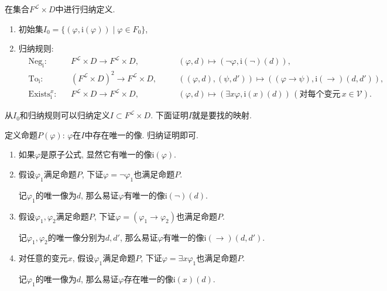 \documentclass[UTF8]{ctexart}
\begin{document}
在集合$F^{\mathcal{L}}\times D$中进行归纳定义.
\begin{enumerate}
    \item 初始集$I_0=\{(\varphi,\mathrm{i}(\varphi))\mid \varphi\in F_0\}$,
    \item 归纳规则:
    \[\begin{aligned}
        &\mathrm{Neg}_{\mathrm{i}}:&&
        F^{\mathcal{L}}\times D\to F^{\mathcal{L}}\times D,\quad&&
        (\varphi,d)\mapsto(\neg\varphi,\mathrm{i}(\neg)(d)),\\[-3pt]
        &\mathrm{To}_{\mathrm{i}}:&&
        (F^{\mathcal{L}}\times D)^2\to F^{\mathcal{L}}\times D,\quad&&
        ((\varphi,d),(\psi,d'))\mapsto((\varphi\to\psi),\mathrm{i}(\to)(d,d')),\\[-3pt]
        &\mathrm{Exists}_{\mathrm{i}}^x:&&
        F^{\mathcal{L}}\times D\to F^{\mathcal{L}}\times D,\quad&&
        (\varphi,d)\mapsto(\exists x\varphi,\mathrm{i}(x)(d))
        \,(\text{对每个变元}\,x\in\mathcal{V}).
    \end{aligned}\]
\end{enumerate}
从$I_0$和归纳规则可以归纳定义$I\subset F^{\mathcal{L}}\times D$.
下面证明$I$就是要找的映射.

定义命题$P(\varphi)$: $\varphi$在$I$中存在唯一的像. 归纳证明即可.

\begin{enumerate}
    \item 如果$\varphi$是原子公式, 显然它有唯一的像$\mathrm{i}(\varphi)$.
    
    \item 假设$\varphi_1$满足命题$P$, 下证$\varphi=\neg\varphi_1$也满足命题$P$.
    
    \hspace{2.17em}
    记$\varphi_1$的唯一像为$d$, 那么易证$\varphi$有唯一的像$\mathrm{i}(\neg)(d)$.

    \item 假设$\varphi_1,\varphi_2$满足命题$P$,
    下证$\varphi=(\varphi_1\to\varphi_2)$也满足命题$P$.

    \hspace{2.17em}
    记$\varphi_1,\varphi_2$的唯一像分别为$d,d'$,
    那么易证$\varphi$有唯一的像$\mathrm{i}(\to)(d,d')$.

    \item 对任意的变元$x$, 假设$\varphi_1$满足命题$P$,
    下证$\varphi=\exists x\varphi_1$也满足命题$P$.

    \hspace{2.17em}
    记$\varphi_1$的唯一像为$d$, 那么易证$\varphi$存在唯一的像$\mathrm{i}(x)(d)$.
\end{enumerate}
\end{document}
